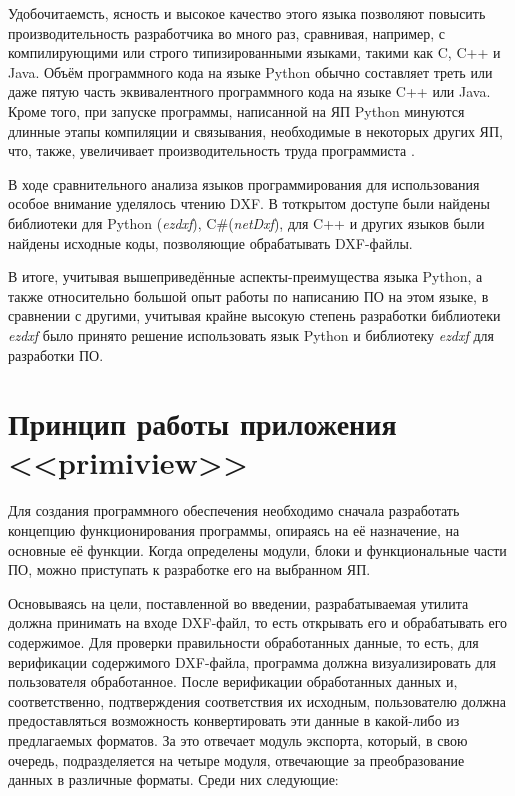Удобочитаемсть, ясность и высокое качество этого языка позволяют повысить производительность разработчика во много раз, сравнивая, например, с компилирующими или строго типизированными языками, такими как C, C++ и Java. Объём программного кода на языке Python обычно составляет треть или даже пятую часть эквивалентного программного кода на языке C++ или Java. Кроме того, при запуске программы, написанной на ЯП Python минуются длинные этапы компиляции и связывания, необходимые в некоторых других ЯП, что, также, увеличивает производительность труда программиста \cite{ascher2004learning}.

В ходе сравнительного анализа языков программирования для использования особое внимание уделялось чтению DXF. В тоткрытом доступе были найдены библиотеки для Python (\textit{ezdxf}), C\#(\textit{netDxf}), для C++ и других языков были найдены исходные коды, позволяющие обрабатывать DXF-файлы.

В итоге, учитывая вышеприведённые аспекты-преимущества языка Python, а также относительно большой опыт работы по написанию ПО на этом языке, в сравнении с другими, учитывая крайне высокую степень разработки библиотеки \textit{ezdxf} было принято решение использовать язык Python и библиотеку \textit{ezdxf} для разработки ПО.


\section{Принцип работы приложения <<primiview>>}

Для создания программного обеспечения необходимо сначала разработать концепцию функционирования программы, опираясь на её назначение, на основные её функции. Когда определены модули, блоки и функциональные части ПО, можно приступать к разработке его на выбранном ЯП.

Основываясь на цели, поставленной во введении, разрабатываемая утилита должна принимать на входе DXF-файл, то есть открывать его и обрабатывать его содержимое. Для проверки правильности обработанных данные, то есть, для верификации содержимого DXF-файла, программа должна визуализировать для пользователя обработанное. После верификации обработанных данных и, соответственно, подтверждения соответствия их исходным, пользователю должна предоставляться возможность конвертировать эти данные в какой-либо из предлагаемых форматов. За это отвечает модуль экспорта, который, в свою очередь, подразделяется на четыре модуля, отвечающие за преобразование данных в различные форматы. Среди них следующие:

